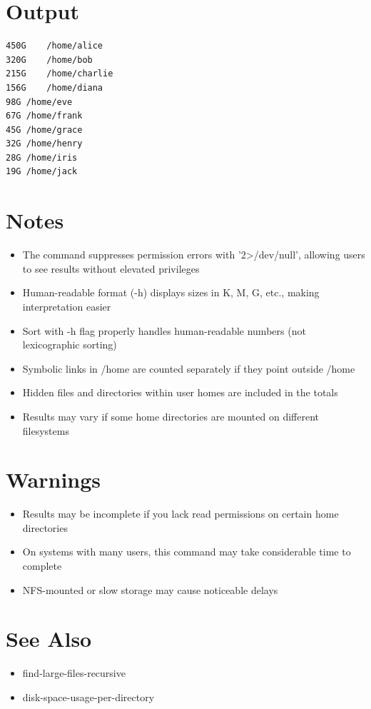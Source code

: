\documentclass[openany]{book}
\begin{document}
\section*{Output}
\begin{lstlisting}
450G	/home/alice
320G	/home/bob
215G	/home/charlie
156G	/home/diana
98G	/home/eve
67G	/home/frank
45G	/home/grace
32G	/home/henry
28G	/home/iris
19G	/home/jack
\end{lstlisting}

\section*{Notes}
\begin{itemize}
  \item The command suppresses permission errors with '2>/dev/null', allowing users to see results without elevated privileges
  \item Human-readable format (-h) displays sizes in K, M, G, etc., making interpretation easier
  \item Sort with -h flag properly handles human-readable numbers (not lexicographic sorting)
  \item Symbolic links in /home are counted separately if they point outside /home
  \item Hidden files and directories within user homes are included in the totals
  \item Results may vary if some home directories are mounted on different filesystems
\end{itemize}

\section*{Warnings}
\begin{itemize}
  \item Results may be incomplete if you lack read permissions on certain home directories
  \item On systems with many users, this command may take considerable time to complete
  \item NFS-mounted or slow storage may cause noticeable delays
\end{itemize}

\section*{See Also}
\begin{itemize}
  \item find-large-files-recursive
  \item disk-space-usage-per-directory
\end{itemize}
\end{document}

